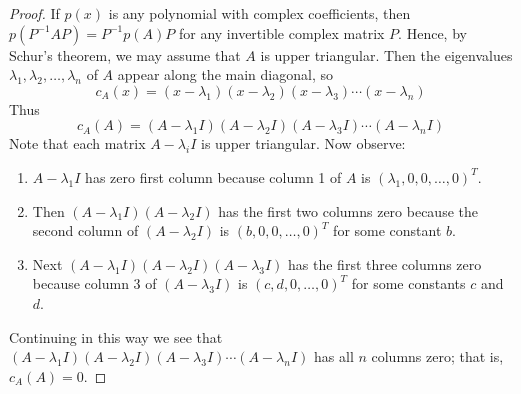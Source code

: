 \begin{proof}
If $p(x)$ is any polynomial with complex coefficients, then $p(P^{-1}AP) = P^{-1}p(A)P$ for any invertible complex matrix $P$. Hence, by Schur's theorem, we may assume that $A$ is upper triangular. Then the eigenvalues $\lambda_{1}, \lambda_{2}, \dots, \lambda_{n}$ of $A$ appear along the main diagonal, so 
\begin{equation*}
c_{A}(x) = (x - \lambda_{1})(x - \lambda_{2})(x - \lambda_{3}) \cdots (x -\lambda_{n})
\end{equation*}
Thus
\begin{equation*}
c_{A}(A) = (A - \lambda_{1}I)(A - \lambda_{2}I)(A - \lambda_{3}I) \cdots (A - \lambda_{n}I)
\end{equation*}
Note that each matrix $A - \lambda_{i}I$ is upper triangular. Now observe:
\begin{enumerate}
\item $A - \lambda_{1}I$ has zero first column because column 1 of $A$ is $(\lambda_{1}, 0, 0, \dots, 0)^{T}$.
\item Then $(A - \lambda_{1}I)(A - \lambda_{2}I)$ has the first two columns zero because the second column of $(A - \lambda_{2}I)$ is $(b, 0, 0, \dots, 0)^{T}$ for some constant $b$.
\item Next $(A - \lambda_{1}I)(A - \lambda_{2}I)(A - \lambda_{3}I)$ has the first three columns zero because column 3 of $(A -\lambda_{3}I)$ is $(c, d, 0, \dots, 0)^{T}$ for some constants $c$ and $d$.
\end{enumerate}
Continuing in this way we see that $(A - \lambda_{1}I)(A - \lambda_{2}I)(A - \lambda_{3}I) \cdots (A - \lambda_{n}I)$ has all $n$ columns zero; that is, $c_{A}(A) = 0$.
\end{proof}
